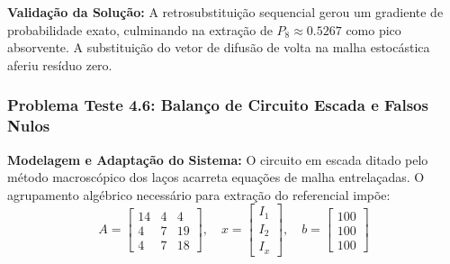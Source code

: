 \textbf{Validação da Solução:} A retrosubstituição sequencial gerou um gradiente de probabilidade exato, culminando na extração de $P_8 \approx 0.5267$ como pico absorvente. A substituição do vetor de difusão de volta na malha estocástica aferiu resíduo zero.

\subsubsection{Problema Teste 4.6: Balanço de Circuito Escada e Falsos Nulos}

\textbf{Modelagem e Adaptação do Sistema:} O circuito em escada ditado pelo método macroscópico dos laços acarreta equações de malha entrelaçadas. O agrupamento algébrico necessário para extração do referencial impõe:
\begin{equation}
A = \begin{bmatrix}
14 & 4 & 4 \\
4 & 7 & 19 \\
4 & 7 & 18
\end{bmatrix}, \quad
x = \begin{bmatrix}
I_1 \\
I_2 \\
I_x
\end{bmatrix}, \quad
b = \begin{bmatrix}
100 \\
100 \\
100
\end{bmatrix}
\end{equation}

\begin{table}[H]
\centering
\caption{Estágios de Anulação da Malha Escada (Problema 4.6 - Gauss)}
\label{tab:gauss_prob46}
\end{table}

